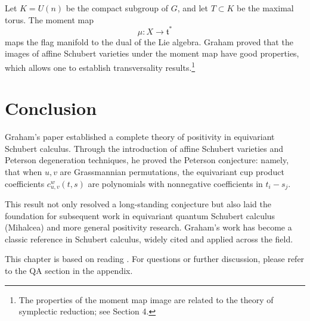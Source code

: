 Let $K = U(n)$ be the compact subgroup of $G$, and let $T \subset K$ be the maximal torus. The moment map
$$\mu: X \to \mathfrak{t}^*$$
maps the flag manifold to the dual of the Lie algebra. Graham proved that the images of affine Schubert varieties under the moment map have good properties, which allows one to establish transversality results.\footnote{The properties of the moment map image are related to the theory of symplectic reduction; see \cite{Gr} Section 4.}

\section{Conclusion}

Graham's paper \cite{Gr} established a complete theory of positivity in equivariant Schubert calculus. Through the introduction of affine Schubert varieties and Peterson degeneration techniques, he proved the Peterson conjecture: namely, that when $u, v$ are Grassmannian permutations, the equivariant cup product coefficients $c_{u,v}^w(t,s)$ are polynomials with nonnegative coefficients in $t_i - s_j$.

This result not only resolved a long-standing conjecture but also laid the foundation for subsequent work in equivariant quantum Schubert calculus (Mihalcea) and more general positivity research. Graham's work has become a classic reference in Schubert calculus, widely cited and applied across the field.

\begin{Remark}
This chapter is based on reading \cite{Gr}. For questions or further discussion, please refer to the QA section in the appendix.
\end{Remark}
